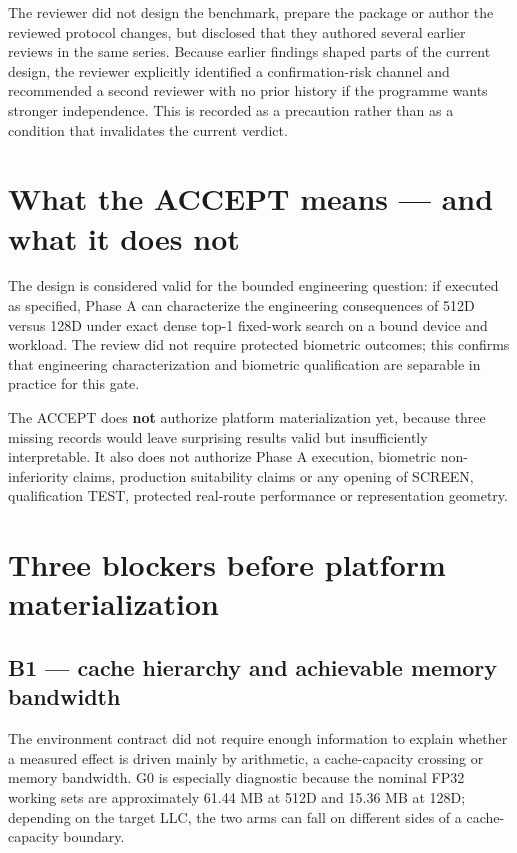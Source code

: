 \documentclass[10pt,a4paper]{article}
\begin{document}
The reviewer did not design the benchmark, prepare the package or author the reviewed protocol changes, but disclosed that
they authored several earlier reviews in the same series. Because earlier findings shaped parts of the current design, the
reviewer explicitly identified a confirmation-risk channel and recommended a second reviewer with no prior history if the
programme wants stronger independence. This is recorded as a precaution rather than as a condition that invalidates the
current verdict.

\section{What the ACCEPT means --- and what it does not}

The design is considered valid for the bounded engineering question: if executed as specified, Phase A can characterize
the engineering consequences of 512D versus 128D under exact dense top-1 fixed-work search on a bound device and workload.
The review did not require protected biometric outcomes; this confirms that engineering characterization and biometric
qualification are separable in practice for this gate.

The ACCEPT does \textbf{not} authorize platform materialization yet, because three missing records would leave surprising
results valid but insufficiently interpretable. It also does not authorize Phase A execution, biometric non-inferiority
claims, production suitability claims or any opening of SCREEN, qualification TEST, protected real-route performance or
representation geometry.

\section{Three blockers before platform materialization}

\subsection*{B1 --- cache hierarchy and achievable memory bandwidth}

The environment contract did not require enough information to explain whether a measured effect is driven mainly by
arithmetic, a cache-capacity crossing or memory bandwidth. G0 is especially diagnostic because the nominal FP32 working
sets are approximately 61.44 MB at 512D and 15.36 MB at 128D; depending on the target LLC, the two arms can fall on
different sides of a cache-capacity boundary.
\end{document}
